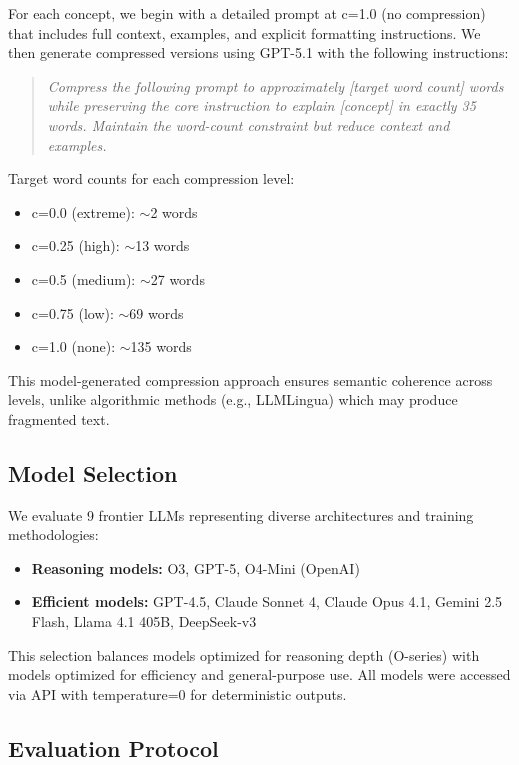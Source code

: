 \documentclass[11pt]{article}
\begin{document}
For each concept, we begin with a detailed prompt at c=1.0 (no compression) that includes full context, examples, and explicit formatting instructions. We then generate compressed versions using GPT-5.1 with the following instructions:

\begin{quote}
\textit{Compress the following prompt to approximately [target word count] words while preserving the core instruction to explain [concept] in exactly 35 words. Maintain the word-count constraint but reduce context and examples.}
\end{quote}

Target word counts for each compression level:
\begin{itemize}
\item c=0.0 (extreme): $\sim$2 words
\item c=0.25 (high): $\sim$13 words
\item c=0.5 (medium): $\sim$27 words
\item c=0.75 (low): $\sim$69 words
\item c=1.0 (none): $\sim$135 words
\end{itemize}

This model-generated compression approach ensures semantic coherence across levels, unlike algorithmic methods (e.g., LLMLingua) which may produce fragmented text.

\subsection{Model Selection}

We evaluate 9 frontier LLMs representing diverse architectures and training methodologies:

\begin{itemize}
\item \textbf{Reasoning models:} O3, GPT-5, O4-Mini (OpenAI)
\item \textbf{Efficient models:} GPT-4.5, Claude Sonnet 4, Claude Opus 4.1, Gemini 2.5 Flash, Llama 4.1 405B, DeepSeek-v3
\end{itemize}

This selection balances models optimized for reasoning depth (O-series) with models optimized for efficiency and general-purpose use. All models were accessed via API with temperature=0 for deterministic outputs.

\subsection{Evaluation Protocol}
\end{document}
